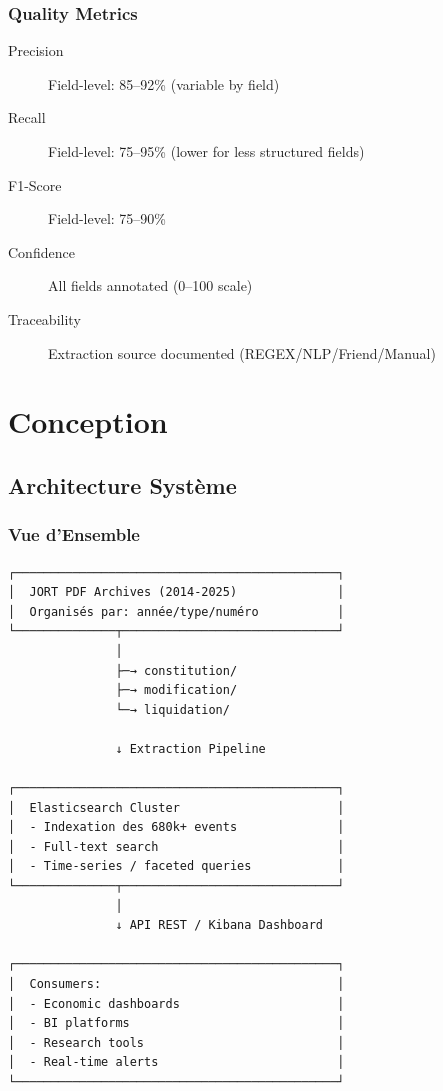 \documentclass[12pt,a4paper]{report}
\begin{document}
\subsection{Quality Metrics}

\begin{description}
    \item[Precision] Field-level: 85--92\% (variable by field)
    \item[Recall] Field-level: 75--95\% (lower for less structured fields)
    \item[F1-Score] Field-level: 75--90\%
    \item[Confidence] All fields annotated (0--100 scale)
    \item[Traceability] Extraction source documented (REGEX/NLP/Friend/Manual)
\end{description}

\chapter{Conception}

\section{Architecture Système}

\subsection{Vue d'Ensemble}

\begin{verbatim}
┌─────────────────────────────────────────────┐
│  JORT PDF Archives (2014-2025)              │
│  Organisés par: année/type/numéro           │
└──────────────┬──────────────────────────────┘
               │
               ├─→ constitution/
               ├─→ modification/
               └─→ liquidation/
               
               ↓ Extraction Pipeline
               
┌─────────────────────────────────────────────┐
│  Elasticsearch Cluster                      │
│  - Indexation des 680k+ events              │
│  - Full-text search                         │
│  - Time-series / faceted queries            │
└──────────────┬──────────────────────────────┘
               │
               ↓ API REST / Kibana Dashboard
               
┌─────────────────────────────────────────────┐
│  Consumers:                                 │
│  - Economic dashboards                      │
│  - BI platforms                             │
│  - Research tools                           │
│  - Real-time alerts                         │
└─────────────────────────────────────────────┘
\end{verbatim}
\end{document}
